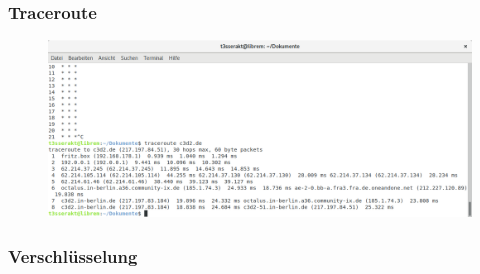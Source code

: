 \documentclass[12pt]{beamer}
\begin{document}
\begin{frame}
  \frametitle{Traceroute}
  \begin{figure}
    \includegraphics[height=0.5\textheight]{img/trace.png}
  \end{figure}
\end{frame}

\begin{frame}
  \frametitle{Verschlüsselung}
  \begin{center}
  \end{center}
\end{frame}
\end{document}
